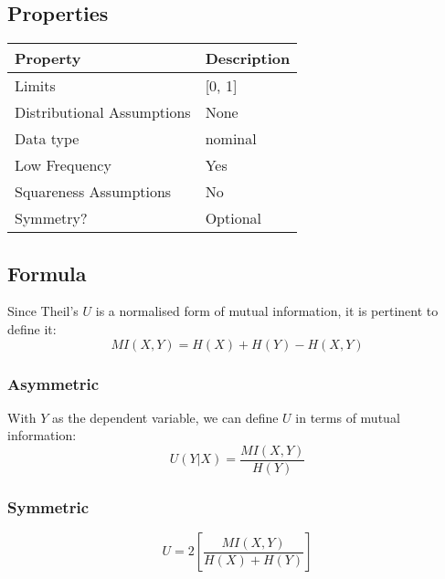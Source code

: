 \documentclass[11pt]{article}
\begin{document}
\subsection{Properties}
\begin{tabular}{| l || l |}
    \hline
    {\bf Property} & {\bf Description} \\
    \hline
    Limits & [0, 1] \\ \hline

    Distributional Assumptions& None \\ \hline

    Data type & nominal \\ \hline

    Low Frequency & Yes \\ \hline

    Squareness Assumptions & No \\ \hline
    
    Symmetry? & Optional \\ \hline

\end{tabular}


\subsection{Formula}
Since Theil's $U$ is a normalised form of mutual information, it is pertinent to define it:
$$
MI(X,Y) = H(X) + H(Y) - H(X, Y)
$$

\subsubsection{Asymmetric}
With $Y$ as the dependent variable, we can define $U$ in terms of mutual information:
$$
U(Y|X) = \frac{ MI(X,Y) }{ H(Y) }
$$

\subsubsection{Symmetric}
$$
U = 2 \left[ \frac{ MI(X,Y) }{ H(X) + H(Y) } \right]
$$
\end{document}
